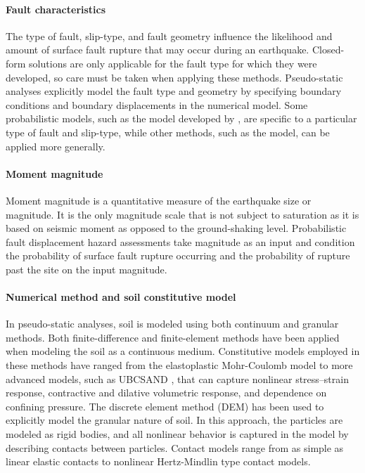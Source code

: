 \paragraph{Fault characteristics}
The type of fault, slip-type, and fault geometry influence the likelihood and amount of surface fault rupture that may occur during an earthquake. Closed-form solutions are only applicable for the fault type for which they were developed, so care must be taken when applying these methods. Pseudo-static analyses explicitly model the fault type and geometry by specifying boundary conditions and boundary displacements in the numerical model. Some probabilistic models, such as the model developed by \citet{moss2011probabilistic}, are specific to a particular type of fault and slip-type, while other methods, such as the \citet{hecker2013variability} model, can be applied more generally.

\paragraph{Moment magnitude}
Moment magnitude is a quantitative measure of the earthquake size or magnitude. It is the only magnitude scale that is not subject to saturation as it is based on seismic moment as opposed to the ground-shaking level. Probabilistic fault displacement hazard assessments take magnitude as an input and condition the probability of surface fault rupture occurring and the probability of rupture past the site on the input magnitude.

\paragraph{Numerical method and soil constitutive model}
In pseudo-static analyses, soil is modeled using both continuum and granular methods. Both finite-difference and finite-element methods have been applied when modeling the soil as a continuous medium. Constitutive models employed in these methods have ranged from the elastoplastic Mohr-Coulomb model to more advanced models, such as UBCSAND \citep{byrne2004numerical}, that can capture nonlinear stress--strain response, contractive and dilative volumetric response, and dependence on confining pressure. The discrete element method (DEM) has been used to explicitly model the granular nature of soil. In this approach, the particles are modeled as rigid bodies, and all nonlinear behavior is captured in the model by describing contacts between particles. Contact models range from as simple as linear elastic contacts to nonlinear Hertz-Mindlin type contact models.

